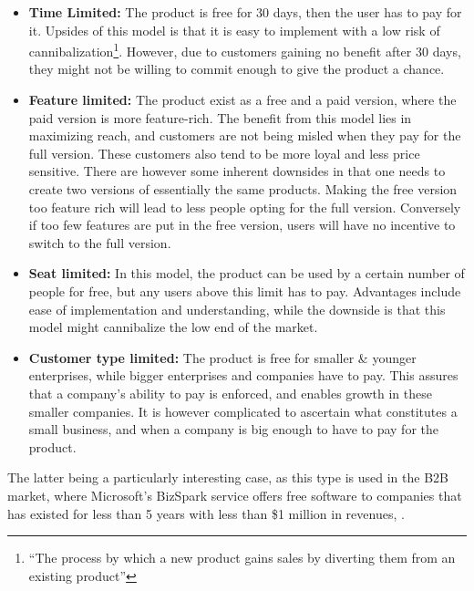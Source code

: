 \begin{itemize}
\item \textbf{Time Limited: }The product is free for 30 days, then the user has to pay for it. Upsides of this model is that it is easy to implement with a low risk of cannibalization\footnote{ “The process by which a new product
gains sales by diverting them from an existing product”\cite{heskettj1976}}. However, due to customers gaining no benefit after 30 days, they might not be willing to commit enough to give the product a chance.
\item \textbf{Feature limited: }The product exist as a free and a paid version, where the paid version is more feature-rich. The benefit from this model lies in maximizing reach, and customers are not being misled when they pay for the full version. These customers also tend to be more loyal and less price sensitive. There are however some inherent downsides in that one needs to create two versions of essentially the same products. Making the free version too feature rich will lead to less people opting for the full version. Conversely if too few features are put in the free version, users will have no incentive to switch to the full version.
\item \textbf{Seat limited: }In this model, the product can be used by a certain number of people for free, but any users above this limit has to pay. Advantages include ease of implementation and understanding, while the downside is that this model might cannibalize the low end of the market.
\item \textbf{Customer type limited: }The product is free for smaller \& younger enterprises, while bigger enterprises and companies have to pay. This assures that a company's ability to pay is enforced, and enables growth in these smaller companies. It is however complicated to ascertain what constitutes a small business, and when a company is big enough to have to pay for the product. 
\end{itemize}
The latter being a particularly interesting case, as this type is used in the B2B market, where Microsoft's BizSpark service offers free software to companies that has existed for less than 5 years with less than \$1 million in revenues, \cite{microsoft2015}.

